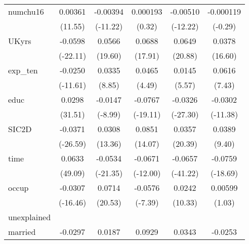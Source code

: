 \begin{table}[htbp]
\begin{tabular}{l*{5}{c}}
numchu16    &     0.00361\sym{***}&    -0.00394\sym{***}&    0.000193         &    -0.00510\sym{***}&   -0.000119         \\
            &     (11.55)         &    (-11.22)         &      (0.32)         &    (-12.22)         &     (-0.29)         \\
UKyrs       &     -0.0598\sym{***}&      0.0566\sym{***}&      0.0688\sym{***}&      0.0649\sym{***}&      0.0378\sym{***}\\
            &    (-22.11)         &     (19.60)         &     (17.91)         &     (20.88)         &     (16.60)         \\
exp\_ten     &     -0.0250\sym{***}&      0.0335\sym{***}&      0.0465\sym{***}&      0.0145\sym{***}&      0.0616\sym{***}\\
            &    (-11.61)         &      (8.85)         &      (4.49)         &      (5.57)         &      (7.43)         \\
educ        &      0.0298\sym{***}&     -0.0147\sym{***}&     -0.0767\sym{***}&     -0.0326\sym{***}&     -0.0302\sym{***}\\
            &     (31.51)         &     (-8.99)         &    (-19.11)         &    (-27.30)         &    (-11.38)         \\
SIC2D       &     -0.0371\sym{***}&      0.0308\sym{***}&      0.0851\sym{***}&      0.0357\sym{***}&      0.0389\sym{***}\\
            &    (-26.59)         &     (13.36)         &     (14.07)         &     (20.39)         &      (9.40)         \\
time        &      0.0633\sym{***}&     -0.0534\sym{***}&     -0.0671\sym{***}&     -0.0657\sym{***}&     -0.0759\sym{***}\\
            &     (49.09)         &    (-21.35)         &    (-12.00)         &    (-41.22)         &    (-18.69)         \\
occup       &     -0.0307\sym{***}&      0.0714\sym{***}&     -0.0576\sym{***}&      0.0242\sym{***}&     0.00599         \\
            &    (-16.46)         &     (20.53)         &     (-7.39)         &     (10.33)         &      (1.03)         \\
\hline
unexplained &                     &                     &                     &                     &                     \\
married     &     -0.0297\sym{***}&      0.0187         &      0.0929\sym{**} &      0.0343\sym{***}&     -0.0253         \\

\end{tabular}
\end{table}
